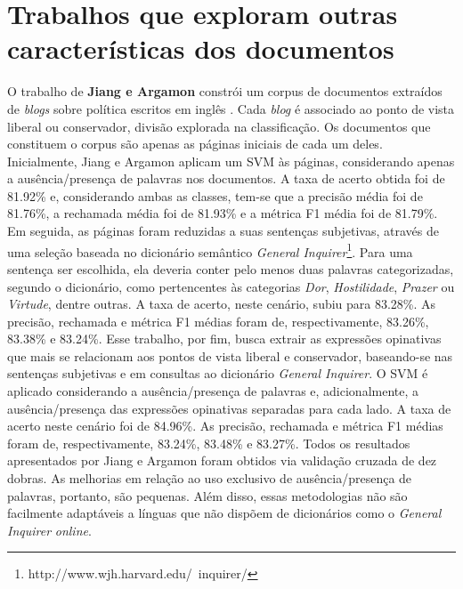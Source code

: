 





\section{Trabalhos que exploram outras características dos documentos}
\label{sintaxe}

O trabalho de \textbf{Jiang e Argamon} constrói um corpus de documentos extraídos de \emph{blogs} sobre política escritos em inglês \cite{jiang-argamon}. Cada \emph{blog} é associado ao ponto de vista liberal ou conservador, divisão explorada na classificação. Os documentos que constituem o corpus são apenas as páginas iniciais de cada um deles. Inicialmente, Jiang e Argamon aplicam um SVM às páginas, considerando apenas a ausência/presença de palavras nos documentos. A taxa de acerto obtida foi de 81.92\% e, considerando ambas as classes, tem-se que a precisão média foi de 81.76\%, a rechamada média foi de 81.93\% e a métrica F1 média foi de 81.79\%. Em seguida, as páginas foram reduzidas a suas sentenças subjetivas, através de uma seleção baseada no dicionário semântico \emph{General Inquirer}\footnote{http://www.wjh.harvard.edu/~inquirer/}. Para uma sentença ser escolhida, ela deveria conter pelo menos duas palavras categorizadas, segundo o dicionário, como pertencentes às categorias \emph{Dor}, \emph{Hostilidade}, \emph{Prazer} ou \emph{Virtude}, dentre outras. A taxa de acerto, neste cenário, subiu para 83.28\%. As precisão, rechamada e métrica F1 médias foram de, respectivamente, 83.26\%, 83.38\% e 83.24\%. Esse trabalho, por fim, busca extrair as expressões opinativas que mais se relacionam aos pontos de vista liberal e conservador, baseando-se nas sentenças subjetivas e em consultas ao dicionário \emph{General Inquirer}. O SVM é aplicado considerando a ausência/presença de palavras e, adicionalmente, a ausência/presença das expressões opinativas separadas para cada lado. A taxa de acerto neste cenário foi de 84.96\%. As precisão, rechamada e métrica F1 médias foram de, respectivamente, 83.24\%, 83.48\% e 83.27\%. Todos os resultados apresentados por Jiang e Argamon foram obtidos via validação cruzada de dez dobras. As melhorias em relação ao uso exclusivo de ausência/presença de palavras, portanto, são pequenas. Além disso, essas metodologias não são facilmente adaptáveis a línguas que não dispõem de dicionários como o \emph{General Inquirer} \emph{online}.


